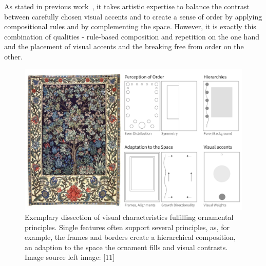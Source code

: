 
As %
stated in previous work~\cite{gieseke_2017_ooo}, it takes artistic expertise to balance the contrast between carefully chosen visual accents and to create a sense of order by applying compositional rules and by complementing the space. However, it is exactly this combination of qualities - rule-based composition and repetition on the one hand and the placement of visual accents and the breaking free from order on the other.

\begin{figure}
       \includegraphics[width=1\columnwidth]{figures/ornament/ornament_principles.png}
 \caption[Ornamentation principles]{\label{fig:ornamentation_principles} Exemplary dissection of visual characteristics fulfilling ornamental principles. Single features often support several principles, as, for example, the frames and borders create a hierarchical composition, an adaption to the space the ornament fills and visual contrasts. Image source left image: [11]}
\end{figure}


